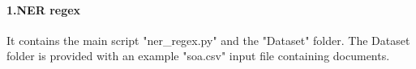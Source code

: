 \documentclass[12pt,leqno]{amsart}
\begin{document}
\begin{comment}
\section{\textbf{Extraction of public administration data from official document}}
The following modules were used to perform a Named Entity Recognition of data from Public Administration documents(mostly tenders).
Those data describe the certifications that a company is required to have to apply for a tender; such certification in Italy are called SOA-certifications(S.O.A.: in Italian "Società degli Organismi di Attestazione", in English "Certification Organizations' Society ").
The modules of this repository were built and used to extract  certifications data from documents.
\newline
\paragraph{\textbf{Modules}}
\begin{enumerate}
\item{\textbf{NER regex:}}
python script that extracts SOA data with the usage of regular expressions;
\item{\textbf{dataset splitter:}} takes a gold.json1 file describing the ground truth; divides it into many labelled sentences, distributing them to the train/dev/test bins;
It's a necessary step for the setup of a NER task in spacy;
\item{\textbf{NER SpaCy:}} bash scripts to initialize, train, debug and evaluate the neural network with the usage of the Spacy library;
\item{\textbf{scorer for regex-extracted data:}} takes in input some regex-extracted soa data (v1, v2 or v3, retrieved by using different regex) and scores them by comparing them to the ground truth;
\item{\textbf{json to csv:}} helper script to convert Spacy-scores from json format to csv format;
\end{enumerate}
documented\_outputs: results of the modules with the real data.
\end{comment}

\newpage
\paragraph{\textbf{1.NER regex}}
It contains the main script "ner\_regex.py" and the "Dataset" folder.
The Dataset folder is provided with an example "soa.csv" input file containing documents.
\end{document}
